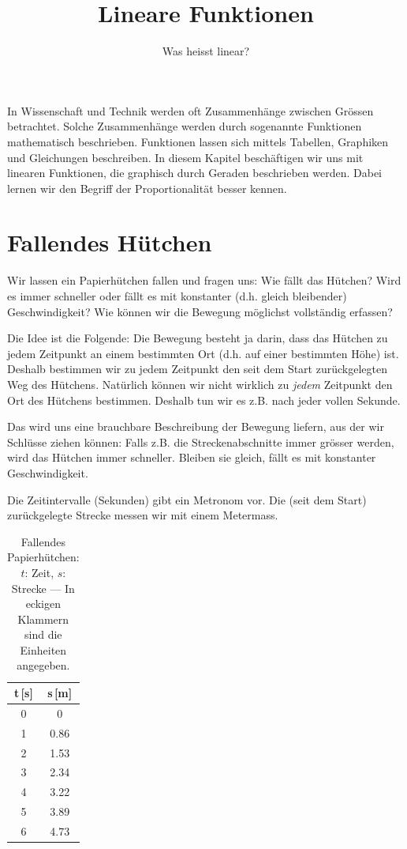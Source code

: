 \documentclass[%
11pt,%
twoside,%
titlepage,%
german,%
headsepline%
]{scrartcl}
\title{Lineare Funktionen}
\subtitle{Was heisst linear?}
\author{}
\date{}
\begin{document}
\maketitle
\tableofcontents
\cleardoublepage

In Wissenschaft und Technik werden oft Zusammenh\"ange zwischen Gr\"ossen betrachtet. Solche Zusammenh\"ange werden durch sogenannte Funktionen mathematisch beschrieben. Funktionen lassen sich mittels Tabellen, Graphiken und Gleichungen beschreiben. In diesem Kapitel besch\"aftigen wir uns mit linearen Funktionen, die graphisch durch Geraden beschrieben werden. Dabei lernen wir den Begriff der Proportionalit\"at besser kennen.

\section{Fallendes H\"utchen}
\label{linfkt1:bsp}

Wir lassen ein Papierh\"utchen fallen und fragen uns: Wie f\"allt das H\"utchen? Wird es immer schneller oder f\"allt es mit konstanter (d.h. gleich bleibender) Geschwindigkeit? Wie k\"onnen wir die Bewegung m\"oglichst vollst\"andig erfassen?

Die Idee ist die Folgende: Die Bewegung besteht ja darin, dass das H\"utchen zu jedem Zeitpunkt an einem bestimmten Ort (d.h. auf einer bestimmten H\"ohe) ist. Deshalb bestimmen wir zu jedem Zeitpunkt den seit dem Start zur\"uckgelegten Weg des H\"utchens. Nat\"urlich k\"onnen wir nicht wirklich zu \emph{jedem} Zeitpunkt den Ort des H\"utchens bestimmen. Deshalb tun wir es z.B. nach jeder vollen Sekunde. 

Das wird uns eine brauchbare Beschreibung der Bewegung liefern, aus der wir Schl\"usse ziehen k\"onnen: Falls z.B. die Streckenabschnitte immer gr\"osser werden, wird das H\"utchen immer schneller. Bleiben sie gleich, f\"allt es mit konstanter Geschwindigkeit.

Die Zeitintervalle (Sekunden) gibt ein Metronom vor. Die (seit dem Start) zur\"uckgelegte Strecke messen wir mit einem Metermass.

\begin{table}[b!]
  \centering
  \begin{tabular}{|c|c|}
    \hline
    t\,[s] & s\,[m] \\ \hline\hline
	0 & 0 \\ \hline
	1 & 0.86 \\ \hline
	2 & 1.53 \\ \hline
	3 & 2.34 \\ \hline
	4 & 3.22 \\ \hline
	5 & 3.89 \\ \hline
	6 & 4.73 \\ \hline
  \end{tabular}
  \caption{Fallendes Papierh\"utchen: $t$: Zeit, $s$: Strecke --- In eckigen Klammern sind die Einheiten angegeben.}
  \label{tab:linfkt1:hut}
\end{table}
\end{document}
